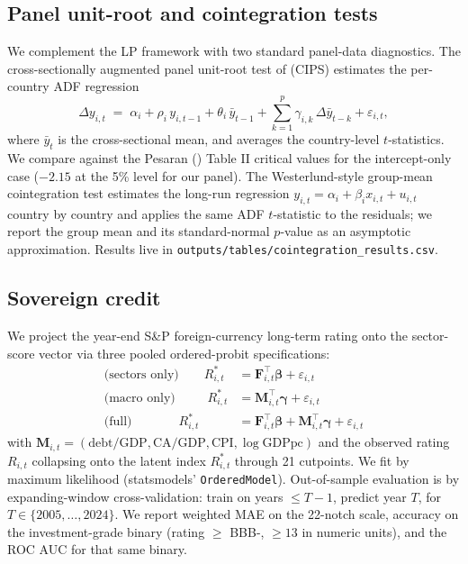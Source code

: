 \subsection{Panel unit-root and cointegration tests}\label{sec:panel_tests}

We complement the LP framework with two standard panel-data diagnostics. The cross-sectionally augmented panel unit-root test of \textcite{pesaran2007} (CIPS) estimates the per-country ADF regression
\begin{equation*}
  \Delta y_{i,t} \;=\; \alpha_i + \rho_i \, y_{i,t-1} + \theta_i \, \bar y_{t-1} + \sum_{k=1}^{p} \gamma_{i,k} \, \Delta \bar y_{t-k} + \varepsilon_{i,t},
\end{equation*}
where $\bar y_t$ is the cross-sectional mean, and averages the country-level $t$-statistics. We compare against the Pesaran (\citeyear{pesaran2007}) Table II critical values for the intercept-only case ($-2.15$ at the 5\% level for our panel). The Westerlund-style group-mean cointegration test \parencite{westerlund2007} estimates the long-run regression $y_{i,t} = \alpha_i + \beta_i x_{i,t} + u_{i,t}$ country by country and applies the same ADF $t$-statistic to the residuals; we report the group mean and its standard-normal $p$-value as an asymptotic approximation. Results live in \texttt{outputs/tables/cointegration\_results.csv}.

\subsection{Sovereign credit}\label{sec:credit_method}

We project the year-end S\&P foreign-currency long-term rating onto the sector-score vector via three pooled ordered-probit specifications:
\begin{align*}
  \text{(sectors only)} \qquad R^*_{i,t} &= \bm{F}_{i,t}^\top \bm{\beta} + \varepsilon_{i,t} \\
  \text{(macro only)} \qquad\;\; R^*_{i,t} &= \bm{M}_{i,t}^\top \bm{\gamma} + \varepsilon_{i,t} \\
  \text{(full)} \qquad\quad\;\;\, R^*_{i,t} &= \bm{F}_{i,t}^\top \bm{\beta} + \bm{M}_{i,t}^\top \bm{\gamma} + \varepsilon_{i,t}
\end{align*}
with $\bm{M}_{i,t} = (\text{debt/GDP}, \text{CA/GDP}, \text{CPI}, \log\text{GDPpc})$ and the observed rating $R_{i,t}$ collapsing onto the latent index $R^*_{i,t}$ through 21 cutpoints. We fit by maximum likelihood (statsmodels' \texttt{OrderedModel}). Out-of-sample evaluation is by expanding-window cross-validation: train on years $\le T-1$, predict year $T$, for $T \in \{2005, \dots, 2024\}$. We report weighted MAE on the 22-notch scale, accuracy on the investment-grade binary (rating $\ge$ BBB-, $\ge 13$ in numeric units), and the ROC AUC for that same binary.

